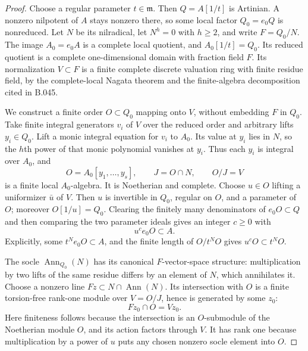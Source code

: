 \begin{proof}
Choose a regular parameter $t\in\mathfrak m$.
Then $Q=A[1/t]$ is Artinian. A nonzero nilpotent
of $A$ stays nonzero there, so some local factor
$Q_0=e_0Q$ is nonreduced. Let $N$ be its nilradical,
let $N^h=0$ with $h\ge2$, and write $F=Q_0/N$.
The image $A_0=e_0A$ is a complete local quotient,
and $A_0[1/t]=Q_0$. Its reduced quotient is a
complete one-dimensional domain with fraction field
$F$. Its normalization $V\subset F$ is a finite
complete discrete valuation ring with finite residue
field, by the complete-local Nagata theorem and the
finite-algebra decomposition cited in B.045.

We construct a finite order $O\subset Q_0$ mapping
onto $V$, without embedding $F$ in $Q_0$.
Take finite integral generators $v_i$ of $V$ over
the reduced order and arbitrary lifts $y_i\in Q_0$.
Lift a monic integral equation for $v_i$ to $A_0$.
Its value at $y_i$ lies in $N$, so the $h$th power
of that monic polynomial vanishes at $y_i$.
Thus each $y_i$ is integral over $A_0$, and
\[
 O=A_0[y_1,\ldots,y_s],\qquad J=O\cap N,
 \qquad O/J=V                                             \tag{B59.1}
\]
is a finite local $A_0$-algebra. It is Noetherian
and complete. Choose $u\in O$ lifting a uniformizer
$\bar u$ of $V$. Then $u$ is invertible in $Q_0$,
regular on $O$, and a parameter of $O$; moreover
$O[1/u]=Q_0$. Clearing the finitely many denominators
of $e_0O\subset Q$ and then comparing the two
parameter ideals gives an integer $c\ge0$ with
\[
                             u^ce_0O\subset A.            \tag{B59.2}
\]
Explicitly, some $t^Ne_0O\subset A$, and the finite
length of $O/t^NO$ gives $u^cO\subset t^NO$.

The socle $\operatorname{Ann}_{Q_0}(N)$ has its
canonical $F$-vector-space structure: multiplication
by two lifts of the same residue differs by an
element of $N$, which annihilates it. Choose a
nonzero line $Fz\subset N\cap\operatorname{Ann}(N)$.
Its intersection with $O$ is a finite torsion-free
rank-one module over $V=O/J$, hence is generated
by some $z_0$:
\[
                           Fz_0\cap O=Vz_0.               \tag{B59.3}
\]
Here finiteness follows because the intersection is
an $O$-submodule of the Noetherian module $O$, and
its action factors through $V$. It has rank one
because multiplication by a power of $u$ puts any
chosen nonzero socle element into $O$.


\end{proof}
